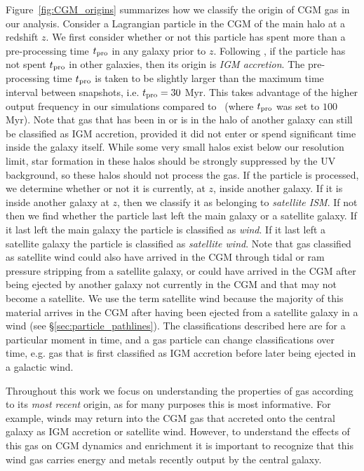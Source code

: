 \documentclass[fleqn,usenatbib]{mnras}
\begin{document}
Figure~\ref{fig:CGM_origins} summarizes how we classify the origin of CGM gas in our analysis.
Consider a Lagrangian particle in the CGM of the main halo at a redshift $z$. 
We first consider whether or not this particle has spent more than a pre-processing time $t_{\rm pro}$ in any galaxy prior to $z$.
Following \cite{Angles-Alcazar2017}, if the particle has not spent $t_{\rm pro}$ in other galaxies, then its origin is \textit{IGM accretion}.
The pre-processing time $t_{\rm pro}$ is taken to be slightly larger than the maximum time interval between snapshots, i.e. $t_{\rm pro}=30$ Myr.
This takes advantage of the higher output frequency in our simulations compared to \cite{Angles-Alcazar2017}~(where $t_{\rm pro}$ was set to $100$ Myr).
Note that gas that has been in or is in the halo of another galaxy can still be classified as IGM accretion, provided it did not enter or spend significant time inside the galaxy itself.
While some very small halos exist below our resolution limit, star formation in these halos should be strongly suppressed by the UV background, so these halos should not process the gas. 
If the particle is processed, we determine whether or not it is currently, at $z$, inside another galaxy.
If it is inside another galaxy at $z$, then we classify it as belonging to \textit{satellite ISM}.
If not then we find whether the particle last left the main galaxy or a satellite galaxy.
If it last left the main galaxy the particle is classified as \textit{wind}.
If it last left a satellite galaxy the particle is classified as \textit{satellite wind}.
Note that gas classified as satellite wind could also have arrived in the CGM through tidal or ram pressure stripping from a satellite galaxy, or could have arrived in the CGM after being ejected by another galaxy not currently in the CGM and that may not become a satellite. 
We use the term satellite wind because the majority of this material arrives in the CGM after having been ejected from a satellite galaxy in a wind (see \S\ref{sec:particle_pathlines}).
The classifications described here are for a particular moment in time, and a gas particle can change classifications over time, e.g. gas that is first classified as IGM accretion before later being ejected in a galactic wind.

Throughout this work we focus on understanding the properties of gas according to its \emph{most recent} origin, as for many purposes this is most informative. 
For example, winds may return into the CGM gas that accreted onto the central galaxy as IGM accretion or satellite wind.
However, to understand the effects of this gas on CGM dynamics and enrichment it is important to recognize that this wind gas carries energy and metals recently output by the central galaxy.
\end{document}
